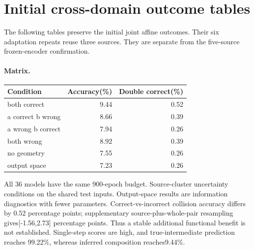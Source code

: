 \section{Initial cross-domain outcome tables}
The following tables preserve the initial joint affine outcomes. Their six adaptation repeats reuse three sources. They are separate from the five-source frozen-encoder confirmation.
\paragraph{Matrix.}
\begin{center}\begin{tabular}{lrr}\toprule Condition & Accuracy(\%) & Double correct(\%)\\\midrule
both correct & 9.44 & 0.52\\
a correct b wrong & 8.66 & 0.39\\
a wrong b correct & 7.94 & 0.26\\
both wrong & 8.92 & 0.39\\
no geometry & 7.55 & 0.26\\
output space & 7.23 & 0.26\\
\bottomrule\end{tabular}\end{center}
All 36 models have the same 900-epoch budget. Source-cluster uncertainty conditions on the shared test inputs. Output-space results are information diagnostics with fewer parameters.
Correct-vs-incorrect collision accuracy differs by 0.52 percentage points; supplementary source-plus-whole-pair resampling gives[-1.56,2.73] percentage points. Thus a stable additional functional benefit is not established. Single-step scores are high, and true-intermediate prediction reaches 99.22\%, whereas inferred composition reaches9.44\%.
